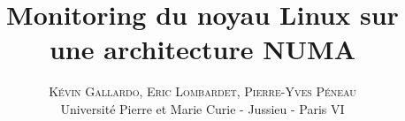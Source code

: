 \documentclass[twoside]{article}
\title{\vspace{+7cm}\fontsize{24pt}{10pt}\selectfont\textbf{Monitoring du noyau Linux sur une architecture NUMA}}
\author{
\large
\textsc{Kévin Gallardo, Eric Lombardet, Pierre-Yves Péneau}\\[2mm] 
\normalsize Université Pierre et Marie Curie - Jussieu - Paris VI
\vspace{-5mm}
}
\date{}
\begin{document}
  \maketitle
  \newpage
  \tableofcontents
  \newpage
  \thispagestyle{fancy}

  \begin{abstract}
    \noindent 
  \end{abstract}

  \begin{multicols}{2}
    
    
    
  \end{multicols}
\end{document}
